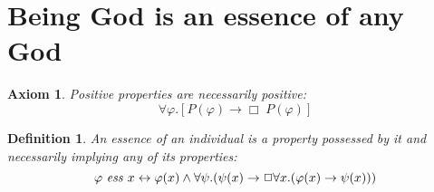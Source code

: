 \documentclass{article}
\newtheorem{axiom}{Axiom}
\newtheorem{definition}{Definition}
\newcommand{\imp}{\rightarrow}
\newcommand{\biimp}{\leftrightarrow}
\newcommand{\all}{\forall}
\newcommand{\nec}{\Box} %
\begin{document}
\section{Being God is an essence of any God}

\begin{axiom}
\label{A4}
Positive properties are necessarily positive:
$$
\all \varphi.[P(\varphi) \to \Box \; P(\varphi)]
$$
\end{axiom}

\begin{definition}
\label{D2}
An \emph{essence} of an individual is a property possessed by it and necessarily implying any of its properties: 
$$
\ess{\varphi}{x} \biimp \varphi(x) \wedge \all \psi. (\psi(x) \imp \nec \all x. (\varphi(x) \imp \psi(x)))
$$
\end{definition}
\end{document}
